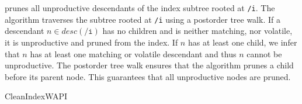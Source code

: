 \documentclass[abstracton,12pt]{scrartcl}
\theoremstyle{definition}
\begin{document}
 prunes all
unproductive descendants of the index subtree rooted at \texttt{/i}. The algorithm traverses
the subtree rooted at \texttt{/i} using a postorder tree walk. If a descendant $n \in
desc(\texttt{/i})$ has no children and is neither matching, nor
volatile, it is unproductive and pruned from the index. If $n$ has at least
one child, we infer
that $n$ has at least one matching or volatile descendant and thus $n$ cannot be
unproductive. The postorder tree walk ensures
that the algorithm prunes a child before its parent node. This guarantees that
all unproductive nodes are pruned.

\begin{algorithm}
  \caption{CleanIndexWAPI}
  \DontPrintSemicolon
  \label{algo:periodic_gc_wapi}
\end{algorithm}

\vspace{-1cm}
\end{document}
